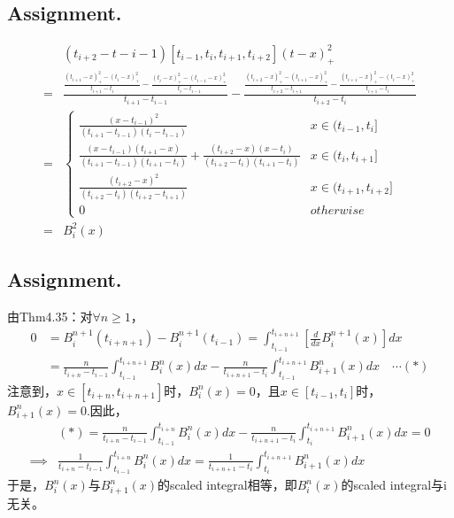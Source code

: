 \documentclass[a4paper,11.5pt,UTF8]{ctexart}
\begin{document}
\begin{large}
\subsection{Assignment.\uppercase\expandafter{}}
\begin{align*}
	& (t_{i+2}-t-{i-1})[t_{i-1},t_i,t_{i+1},t_{i+2}](t-x)_+^2 \\
	= &  \frac{\frac{(t_{i+1}-x)_+^2-(t_i-x)_+^2}{t_{i+1}-t_i}-\frac{(t_i-x)_+^2-(t_{i-1}-x)_+^2}{t_i-t_{i-1}}}{t_{i+1}-t_{i-1}}-\frac{\frac{(t_{i+2}-x)_+^2-(t_{i+1}-x)_+^2}{t_{i+2}-t_{i+1}}-\frac{(t_{i+1}-x)_+^2-(t_i-x)_+^2}{t_{i+1}-t_i}}{t_{i+2}-t_i} \\
	= & \begin{cases}
		\frac{(x-t_{i-1})^2}{(t_{i+1}-t_{i-1})(t_i-t_{i-1})} & x\in(t_{i-1},t_i] \\
		\frac{(x-t_{i-1})(t_{i+1}-x)}{(t_{i+1}-t_{i-1})(t_{i+1}-t_{i})}+\frac{(t_{i+2}-x)(x-t_{i})}{(t_{i+2}-t_{i})(t_{i+1}-t_{i})} & x\in (t_i,t_{i+1}] \\
		\frac{(t_{i+2}-x)^2}{(t_{i+2}-t_{i})(t_{i+2}-t_{i+1})} & x\in (t_{i+1},t_{i+2}]\\ 
		0 & otherwise 
	\end{cases} \\
	= & B_i^2(x)
\end{align*}

\subsection{Assignment.\uppercase\expandafter{}}
\par 由Thm4.35：对$\forall n\geqslant 1$，
\begin{align*}
	0&=B_{i}^{n+1}(t_{i+n+1})-B_{i}^{n+1}(t_{i-1})=\int_{t_{i-1}}^{t_{i+n+1}}\left[ \frac{d}{dx}B_i^{n+1}(x) \right]dx \\
	&=\frac{n}{t_{i+n}-t_{i-1}}\int_{t_{i-1}}^{t_{i+n+1}}B_i^n(x)dx - \frac{n}{t_{i+n+1}-t_i}\int_{t_{i-1}}^{t_{i+n+1}}B_{i+1}^n(x)dx \quad\cdots (*)
\end{align*}
注意到，$x\in[t_{i+n},t_{i+n+1}]$时，$B_i^n(x)=0$，且$x\in[t_{i-1},t_i]$时，$B_{i+1}^n(x)=0$.因此，
\begin{align*}
	&(*)=\frac{n}{t_{i+n}-t_{i-1}}\int_{t_{i-1}}^{t_{i+n}}B_i^n(x)dx - \frac{n}{t_{i+n+1}-t_i}\int_{t_{i}}^{t_{i+n+1}}B_{i+1}^n(x)dx =0 \\
	\implies & \frac{1}{t_{i+n}-t_{i-1}}\int_{t_{i-1}}^{t_{i+n}}B_i^n(x)dx = \frac{1}{t_{i+n+1}-t_i}\int_{t_{i}}^{t_{i+n+1}}B_{i+1}^n(x)dx
\end{align*}
于是，$B_i^n(x)$与$B_{i+1}^n(x)$的scaled integral相等，即$B_i^n(x)$的scaled integral与i无关。



\end{large}
\end{document}
